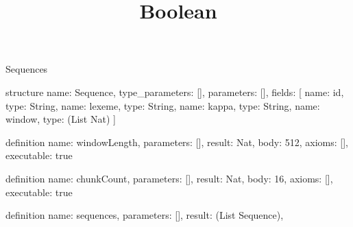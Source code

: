 \begin{lexlean}{Sequences}
\title{Boolean}
\begin{semanticmodule}
structure{
  name: Sequence,
  type_parameters: [],
  parameters: [],
  fields: [
    {name: id, type: String},
    {name: lexeme, type: String},
    {name: kappa, type: String},
    {name: window, type: (List Nat)}
  ]
}

definition{
  name: windowLength,
  parameters: [],
  result: Nat,
  body: 512,
  axioms: [],
  executable: true
}

definition{
  name: chunkCount,
  parameters: [],
  result: Nat,
  body: 16,
  axioms: [],
  executable: true
}

definition{
  name: sequences,
  parameters: [],
  result: (List Sequence),
}
\end{semanticmodule}
\end{lexlean}
